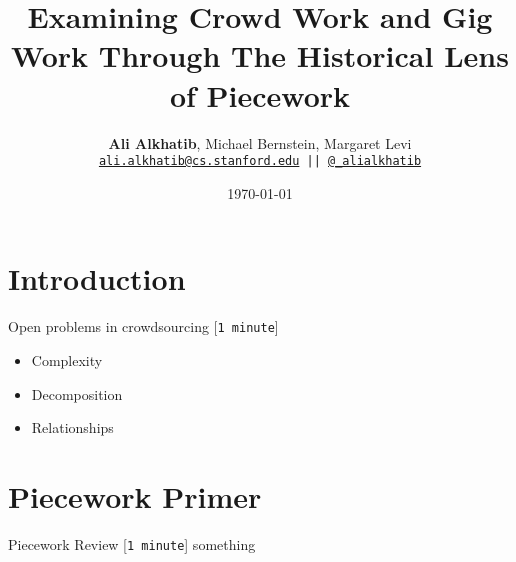 \documentclass{beamer}
\title{Examining Crowd Work and Gig Work Through The Historical Lens of Piecework}
\author{\textbf{Ali Alkhatib},
                Michael Bernstein,
                Margaret Levi\\
\texttt{ \scriptsize{\href{mailto:ali.alkhatib@cs.stanford.edu}{ali.alkhatib@cs.stanford.edu} ||
         \href{http://twitter.com/_alialkhatib}{@\_alialkhatib}} }}
\institute[Stanford]{Stanford University}
\date{\today}
\begin{document}
\begin{frame}
\titlepage
\end{frame}





\section{Introduction}

\begin{frame}{Open problems in crowdsourcing
                                                                                [\texttt{1 minute}]
}
\begin{itemize}[<+- | alert@+>]
  \item Complexity~\cite{suzukiAtelier,KimStoria,yuanAlmost,
                         YuEncouragingOutside,
                         Nebeling:2016:WCW:2858036.2858169,
                         Hahn:2016:KAB:2858036.2858364}
  \item Decomposition
  \item Relationships
\end{itemize}
\end{frame}


\section{Piecework Primer}
\begin{frame}{Piecework Review
                                                                                [\texttt{1 minute}]
}
something
\end{frame}
\end{document}
